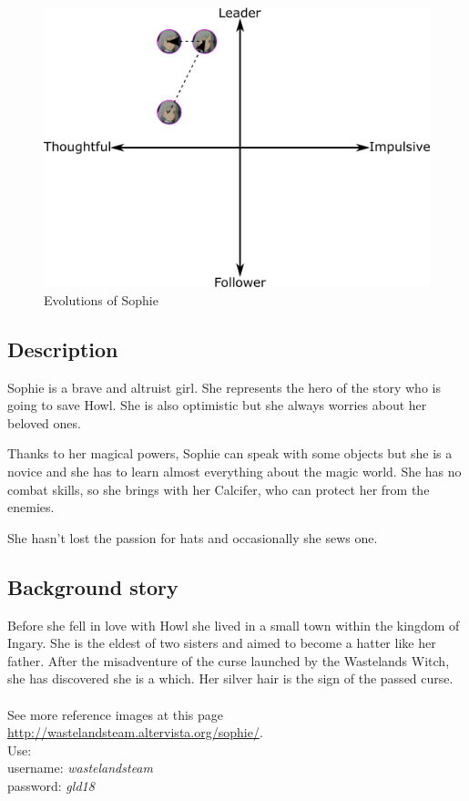 \begin{figure}[H]
  \centering
  \includegraphics[width=14cm]{Images/Diagrams/Evolutions/sophieEvolution}
  \caption{Evolutions of Sophie}
\end{figure}

\subsection{Description}
Sophie is a brave and altruist girl. She represents the hero of the story who is going to save Howl. She is also optimistic but she always worries about her beloved ones.

Thanks to her magical powers, Sophie can speak with some objects but she is a novice and she has to learn almost everything about the magic world. She has no combat skills, so she brings with her Calcifer, who can protect her from the enemies.

She hasn't lost the passion for hats and occasionally she sews one.

\subsection{Background story}
Before she fell in love with Howl she lived in a small town within the kingdom of Ingary. She is the eldest of two sisters and aimed to become a hatter like her father. After the misadventure of the curse launched by the Wastelands Witch, she has discovered she is a which. Her silver hair is the sign of the passed curse.\\\\
See more reference images at this page \href{http://wastelandsteam.altervista.org/sophie/}{http://wastelandsteam.altervista.org/sophie/}.\\
Use:\\
username: \textit{wastelandsteam}\\
password: \textit{gld18}
